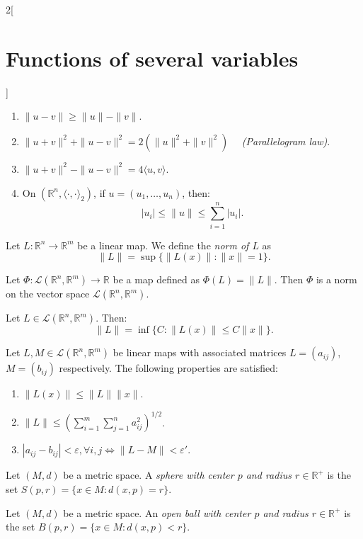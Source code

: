 \documentclass[class=article,10pt,crop=false]{standalone}
\begin{document}
\begin{multicols}{2}[\section{Functions of several variables}]
\begin{prop}
\begin{enumerate}
    \item $\|u-v\|\geq\|u\|-\|v\|$.
    \item $\|u+v\|^2+\|u-v\|^2=2(\|u\|^2+\|v\|^2)\quad$ \textit{(Parallelogram law)}.
    \item $\|u+v\|^2-\|u-v\|^2=4\langle u,v\rangle$.
    \item On $(\mathbb{R}^n,\langle\cdot,\cdot\rangle_2)$, if $u=(u_1,\ldots,u_n)$, then: $$|u_i|\leq\|u\|\leq\sum_{i=1}^n|u_i|.$$
\end{enumerate}
\end{prop}
\begin{definition}
Let $L:\mathbb{R}^n\rightarrow\mathbb{R}^m$ be a linear map. We define the \textit{norm of $L$} as $$\|L\|=\sup\{\|L(x)\|:\|x\|=1\}.$$
\end{definition}
\begin{lemma}
Let $\Phi:\mathcal{L}(\mathbb{R}^n,\mathbb{R}^m)\rightarrow\mathbb{R}$ be a map defined as $\Phi(L)=\|L\|$. Then $\Phi$ is a norm on the vector space $\mathcal{L}(\mathbb{R}^n,\mathbb{R}^m)$.
\end{lemma}
\begin{prop}
Let $L\in\mathcal{L}(\mathbb{R}^n,\mathbb{R}^m)$. Then: $$\|L\|=\inf\{C:\|L(x)\|\leq C\|x\|\}.$$
\end{prop}
\begin{corollary}
Let $L,M\in\mathcal{L}(\mathbb{R}^n,\mathbb{R}^m)$ be linear maps with associated matrices $L=(a_{ij})$, $M=(b_{ij})$ respectively. The following properties are satisfied:
\begin{enumerate}
    \item $\|L(x)\|\leq\|L\|\|x\|$.
    \item $\displaystyle\|L\|\leq\left(\sum_{i=1}^m\sum_{j=1}^na_{ij}^2\right)^{1/2}$.
    \item $|a_{ij}-b_{ij}|<\varepsilon,\forall i,j\iff\|L-M\|<\varepsilon'$.
\end{enumerate}
\end{corollary}
\begin{definition}
Let $(M,d)$ be a metric space. A \textit{sphere with center $p$ and radius $r\in\mathbb{R}^+$} is the set $S(p,r)=\{x\in M:d(x,p)=r\}$.
\end{definition}
\begin{definition}
Let $(M,d)$ be a metric space. An \textit{open ball with center $p$ and radius $r\in\mathbb{R}^+$} is the set $B(p,r)=\{x\in M:d(x,p)<r\}$.
\end{definition}
\begin{definition}

\end{definition}
\end{multicols}
\end{document}
